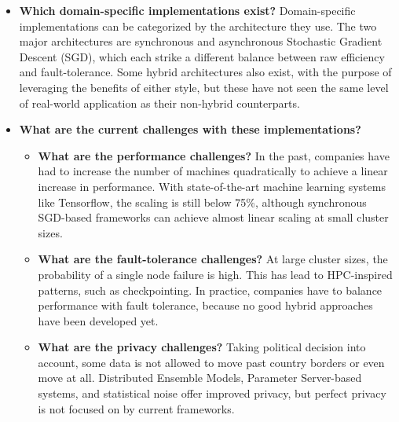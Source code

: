 \begin{itemize}
	\begin{itemize}
		\item \textbf{Which domain-specific implementations exist?}
		Domain-specific implementations can be categorized by the architecture they use. The two major architectures are synchronous and asynchronous Stochastic Gradient Descent (SGD), which each strike a different balance between raw efficiency and fault-tolerance. Some hybrid architectures also exist, with the purpose of leveraging the benefits of either style, but these have not seen the same level of real-world application as their non-hybrid counterparts.
		\item \textbf{What are the current challenges with these implementations?}
		\begin{itemize}
			\item \textbf{What are the performance challenges?} In the past, companies have had to increase the number of machines quadratically to achieve a linear increase in performance. With state-of-the-art machine learning systems like Tensorflow, the scaling is still below 75\%, although synchronous SGD-based frameworks can achieve almost linear scaling at small cluster sizes.
			\item \textbf{What are the fault-tolerance challenges?} At large cluster sizes, the probability of a single node failure is high. This has lead to HPC-inspired patterns, such as checkpointing. In practice, companies have to balance performance with fault tolerance, because no good hybrid approaches have been developed yet.
			\item \textbf{What are the privacy challenges?} Taking political decision into account, some data is not allowed to move past country borders or even move at all. Distributed Ensemble Models, Parameter Server-based systems, and statistical noise offer improved privacy, but perfect privacy is not focused on by current frameworks.
		\end{itemize}
	\end{itemize}
\end{itemize}
